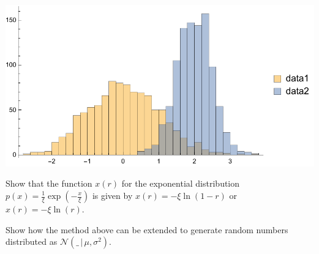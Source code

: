 \documentclass{tstextbook}
\begin{document}
 \includegraphics{images/normal_distributions_from_data.pdf}
   
\begin{exercise}
  Show that the function $x(r)$ for the exponential distribution 
  $p(x)=\frac{1}{\xi}\exp\left(-\frac{x}{\xi}\right)$ is given by $x(r)=-\xi\ln\left(1-r\right)$ or $x(r)=-\xi\ln\left(r\right)$.   
\end{exercise}

\begin{exercise}
  Show how the method above can be extended to generate random numbers distributed as $\mathcal{N}(\_\,\vert\,\mu,\sigma^2)$.   
\end{exercise}
\end{document}
